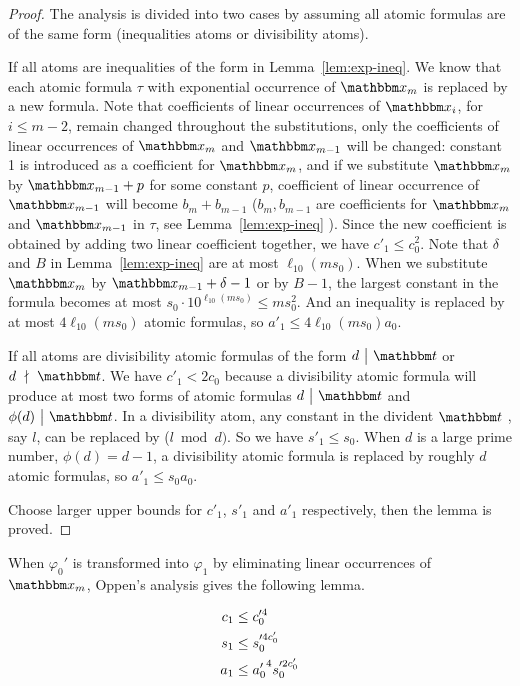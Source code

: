 \begin{proof}
The analysis is divided into two cases by assuming all atomic formulas are of the same form (inequalities atoms or divisibility atoms). 

If all atoms are inequalities of the form in Lemma~\ref{lem:exp-ineq}. We know that each atomic formula $\tau$ with exponential occurrence of $\ivarx_m$ is replaced by a new formula. Note that coefficients of linear occurrences of $\ivarx_i$, for $i\le m-2$, remain changed throughout the substitutions, only the coefficients of linear occurrences of $\ivarx_m$ and $\ivarx_{m-1}$ will be changed: constant 1 is introduced as a coefficient for $\ivarx_m$, and if we substitute $\ivarx_m$ by $\ivarx_{m-1}+p$ for some constant $p$, coefficient of linear occurrence of $\ivarx_{m-1}$ will become $b_m+b_{m-1}$ ($b_m,b_{m-1}$ are coefficients for $\ivarx_{m}$ and $\ivarx_{m-1}$ in $\tau$, see Lemma~\ref{lem:exp-ineq} ). Since the new coefficient is obtained by adding two linear coefficient together, we have $c'_1\le c_0^2$. Note that $\delta$ and $B$ in Lemma~\ref{lem:exp-ineq} are at most $\ell_{10}(ms_0)$. When we substitute $\ivarx_m$ by $\ivarx_{m-1}+\delta-1$ or by $B-1$, the largest constant in the formula becomes at most $s_0\cdot  10^{\ell_{10}(ms_0)}\le ms_0^2$. And an inequality is replaced by at most $4\ell_{10}(ms_0)$ atomic formulas, so $a'_1\le 4\ell_{10}(ms_0)a_0$.

If all atoms are divisibility atomic formulas of the form $d \ \big \vert  \ \iterm$ or $d \ \nmid \ \iterm$. We have $c'_1<2c_0$ because a divisibility atomic formula  will produce at most two forms of atomic formulas $d \ \big \vert  \ \iterm$ and $\phi(d) \ \big \vert  \ \iterm$. In a divisibility atom, any constant in the divident $\iterm$ , say $l$, can be replaced by ($l \bmod d)$. So we have $s'_1\le s_0$. When $d$ is a large prime number, $\phi(d)=d-1$, a divisibility atomic formula is replaced by roughly $d$ atomic formulas, so $a'_1\le s_0a_0$. 

Choose larger upper bounds for $c'_1$, $s'_1$ and $a'_1$ respectively, then the lemma is proved.

\end{proof}

When $\varphi_0'$ is transformed into $\varphi_{1}$ by eliminating linear occurrences of $\ivarx_m$, Oppen's analysis gives the following lemma.

\begin{lemma}\cite{Oppen73}\label{lem:cpx oppen}
    \begin{align}
        c_1&\le c_0'^4 \notag \\
        s_1&\le s_0'^{4c_0'} \notag\\
        a_1&\le {a_0'}^4 s_0'^{2c_0'}\notag 
    \end{align} 
\end{lemma}

